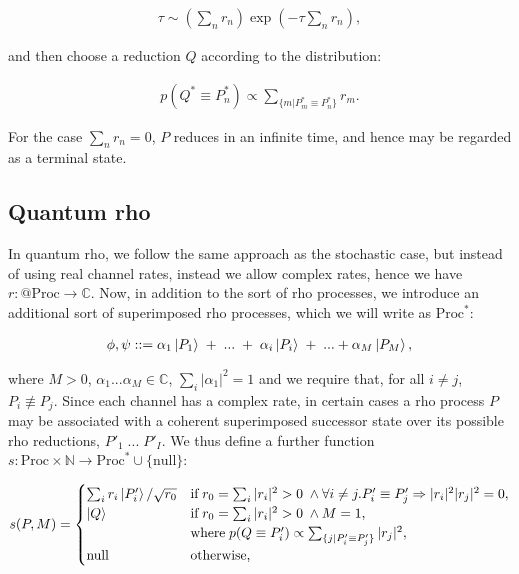 \begin{eqnarray}
\tau \sim \left(\sum_n r_n\right) \exp\left(-\tau\sum_n r_n\right),
\end{eqnarray}

\noindent and then choose a reduction $Q$ according to the distribution:

\begin{eqnarray}\label{eq:prob_update}
p(Q^*\equiv P^*_n) \propto \sum_{\{m|P^*_m\equiv P^*_n\}} r_m.
\end{eqnarray}

\noindent For the case $\sum_n r_n = 0$, $P$ reduces in an infinite time, and hence may be regarded as a terminal state.

\subsection{Quantum rho}

In quantum rho, we follow the same approach as the stochastic case, but instead of using real channel rates, instead we allow complex rates, hence we have $r:@\text{Proc} \rightarrow \mathbb{C}$.  Now, in addition to the sort of rho processes, we introduce an additional sort of superimposed rho processes, which we will write as $\text{Proc}^*$:

\begin{eqnarray}
\phi, \psi ::= \alpha_1 \ket{P_1} \; + \; ... \; + \; \alpha_i \ket{P_i} \; + \; ...  + \alpha_M \ket{P_M},
\end{eqnarray}

\noindent where $M>0$, $\alpha_1 ... \alpha_M \in \mathbb{C}$, $\sum_i |\alpha_1|^2 = 1$ and we require that, for all $i\neq j$, $P_i \not\equiv P_j$.  Since each channel has a complex rate, in certain cases a rho process $P$ may be associated with a coherent superimposed successor state over its possible rho reductions, $P'_1 \; ... \; P'_I$.  We thus define a further function $s:\text{Proc} \times \mathbb{N} \rightarrow \text{Proc}^*\cup\{\text{null}\}$:

\begin{eqnarray}\label{eq:succ_state}
s(P,M) = 
\begin{cases}
\sum_i r_i \ket{P'_i}/\sqrt{r_0} & \text{if} \; r_0 = \sum_i |r_i|^2 > 0 \; \wedge\forall i\neq j. P'_i \equiv P'_j \Rightarrow |r_i|^2 |r_j|^2 = 0, \\
\ket{Q}
 & \text{if} \; r_0 = \sum_i |r_i|^2 > 0 \; \wedge M=1, \\ & \text{where} \; p(Q\equiv P'_i)\propto \sum_{\{j|P'_i\equiv P'_j\}} |r_j|^2, \\
\text{null} & \text{otherwise,}
\end{cases}\nonumber\\
\end{eqnarray}

